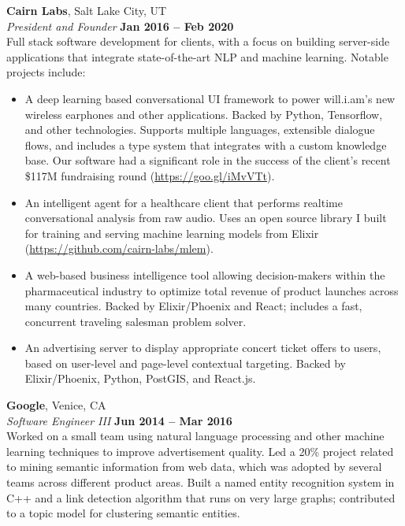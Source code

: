 \documentclass[margin,line]{resume}
\begin{document}
\begin{resume}
    \textbf{Cairn Labs}, Salt Lake City, UT \vspace{2mm}\\\vspace{1mm}%
    \textsl{President and Founder} \hfill \textbf{Jan 2016 -- Feb 2020}\\
    Full stack software development for clients, with a focus on building
    server-side applications that integrate state-of-the-art NLP and
    machine learning. Notable projects include:

    \begin{itemize}
    \item A deep learning based conversational UI framework to power
      will.i.am's new wireless earphones and other applications. Backed by
      Python, Tensorflow, and other technologies. Supports multiple languages,
      extensible dialogue flows, and includes a type system that integrates with
      a custom knowledge base. Our software had a significant role in the
      success of the client's recent \$117M fundraising round
      (\url{https://goo.gl/iMvVTt}).
    \item An intelligent agent for a healthcare client that performs realtime
      conversational analysis from raw audio. Uses an open source library I
      built for training and serving machine learning models from Elixir
      (\url{https://github.com/cairn-labs/mlem}).
    \item A web-based business intelligence tool allowing decision-makers
      within the pharmaceutical industry to optimize total revenue of product
      launches across many countries. Backed by Elixir/Phoenix and React;
      includes a fast, concurrent traveling salesman problem solver.
    \item An advertising server to display appropriate concert ticket offers
      to users, based on user-level and page-level contextual targeting. Backed
      by Elixir/Phoenix, Python, PostGIS, and React.js.
    \end{itemize}

    \textbf{Google}, Venice, CA \vspace{2mm}\\\vspace{1mm}%
    \textsl{Software Engineer III} \hfill \textbf{Jun 2014 -- Mar 2016}\\
    Worked on a small team using natural language processing and other machine
    learning techniques to improve advertisement quality. Led a 20\% project
    related to mining semantic information from web data, which was adopted by
    several teams across different product areas. Built a named entity
    recognition system in C++ and a link detection algorithm that runs on very
    large graphs; contributed to a topic model for clustering semantic entities.


\end{resume}
\end{document}
